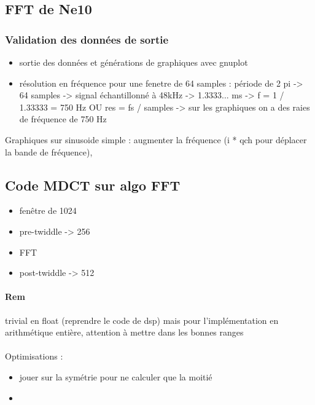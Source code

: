 \documentclass{article}
\begin{document}
    \subsection{FFT de Ne10}

    \subsubsection{Validation des données de sortie}
    \begin{itemize}
        \item sortie des données et générations de graphiques avec gnuplot
        \item résolution en fréquence pour une fenetre de 64 samples : période de 2 pi -> 64 samples -> signal échantillonné à 48kHz -> 1.3333... ms -> f = 1 / 1.33333 = 750 Hz OU res = fs / samples -> sur les graphiques on a des raies de fréquence de 750 Hz
    \end{itemize}

    Graphiques sur sinusoide simple : augmenter la fréquence (i * qch pour déplacer la bande de fréquence), 

    \subsection{Code MDCT sur algo FFT}
    \begin{itemize}
        \item fenêtre de 1024
        \item pre-twiddle -> 256
        \item FFT
        \item post-twiddle -> 512
    \end{itemize}
    
    \paragraph{Rem} trivial en float (reprendre le code de dsp) mais pour l'implémentation en arithmétique entière, attention à mettre dans les bonnes ranges

    \paragraph{}
    Optimisations :
    \begin{itemize}
        \item jouer sur la symétrie pour ne calculer que la moitié
        \item 
    \end{itemize}
\end{document}
